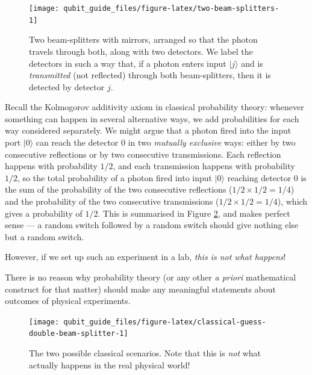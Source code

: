 \documentclass[fleqn,a4paper]{article}
\newenvironment{idea}{\everypar{\setlength{\parindent}{1.5em}}}{}
\theoremstyle{definition}
\theoremstyle{definition}
\theoremstyle{definition}
\theoremstyle{definition}
\theoremstyle{remark}
\begin{document}
\begin{figure}[H]

{\centering \texttt{[image: qubit\_guide\_files/figure-latex/two-beam-splitters-1]} 

}

\caption{Two beam-splitters with mirrors, arranged so that the photon travels through both, along with two detectors. We label the detectors in such a way that, if a photon enters input \(|j\rangle\) and is \emph{transmitted} (not reflected) through both beam-splitters, then it is detected by detector \(j\).}\label{fig:two-beam-splitters}
\end{figure}

Recall the Kolmogorov additivity axiom in classical probability theory: whenever something can happen in several alternative ways, we add probabilities for each way considered separately.
We might argue that a photon fired into the input port \(|0\rangle\) can reach the detector \(0\) in two \emph{mutually exclusive} ways: either by two consecutive reflections or by two consecutive transmissions.
Each reflection happens with probability \(1/2\), and each transmission happens with probability \(1/2\), so the total probability of a photon fired into input \(|0\rangle\) reaching detector \(0\) is the sum of the probability of the two consecutive reflections (\(1/2\times 1/2 = 1/4\)) and the probability of the two consecutive transmissions (\(1/2\times 1/2 = 1/4\)), which gives a probability of \(1/2\).
This is summarised in Figure \ref{fig:classical-guess-double-beam-splitter}, and makes perfect sense --- a random switch followed by a random switch should give nothing else but a random switch.

However, if we set up such an experiment in a lab, \emph{this is not what happens}!

\begin{idea}
There is no reason why probability theory (or any other \emph{a priori} mathematical construct for that matter) should make any meaningful statements about outcomes of physical experiments.

\end{idea}



\begin{figure}[H]

{\centering \texttt{[image: qubit\_guide\_files/figure-latex/classical-guess-double-beam-splitter-1]} 

}

\caption{The two possible classical scenarios. Note that this is \emph{not} what actually happens in the real physical world!}\label{fig:classical-guess-double-beam-splitter}
\end{figure}
\end{document}
